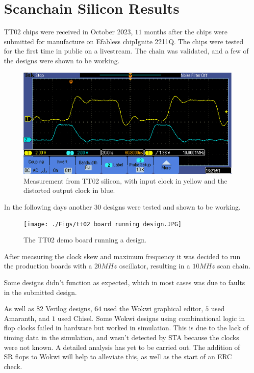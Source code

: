 \section{Scanchain Silicon Results}
\label{sec:scan_chain_res}

TT02 chips were received in October 2023, \(11\) months after the chips were submitted for manufacture on Efabless chipIgnite 2211Q.
The chips were tested for the first time in public on a livestream\cite{wokwi}.
The chain was validated, and a few of the designs were shown to be working.

\begin{figure}[htp]
\centering
\includegraphics[width=\columnwidth]{./Figs/tt02_clock_out.png}
\caption{Measurement from TT02 silicon, with input clock in yellow and the distorted output clock in blue.}
\label{fig:TT02_silicon_measurement}
\end{figure}

In the following days another \(30\) designs were tested and shown to be working.

\begin{figure}[htp]
\centering
\texttt{[image: ./Figs/tt02 board running design.JPG]}
\caption{The TT02 demo board running a design.}
\label{fig:TT02_demo_board_design}
\end{figure}

After measuring the clock skew and maximum frequency it was decided to run the production boards with a \(20MHz\) oscillator, resulting in a \(10MHz\) scan chain.

Some designs didn’t function as expected, which in most cases was due to faults in the submitted design.

As well as \(82\) Verilog designs, \(64\) used the Wokwi graphical editor, \(5\) used Amaranth, and \(1\) used Chisel.
Some Wokwi\cite{wokwiagain} designs using combinational logic in flop clocks failed in hardware but worked in simulation.
This is due to the lack of timing data in the simulation, and wasn’t detected by STA because the clocks were not known.
A detailed analysis has yet to be carried out.
The addition of SR flops to Wokwi will help to alleviate this, as well as the start of an ERC check.

